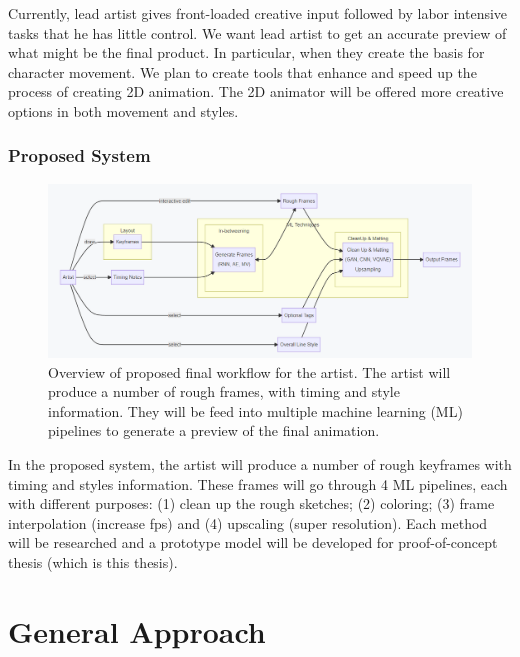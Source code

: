 Currently, lead artist gives front-loaded creative input followed by labor intensive tasks that he has little control. We want lead artist to get an accurate preview of what might be the final product. In particular, when they create the basis for character movement. We plan to create tools that enhance and speed up the process of creating 2D animation. The 2D animator will be offered more creative options in both movement and styles.

\subsubsection{Proposed System}

\begin{figure}
    \centering
    \includegraphics[width=1\textwidth]{images/introduction/proposed_workflow.png}
    \caption{Overview of proposed final workflow for the artist. The artist will produce a number of rough frames, with timing and style information. They will be feed into multiple machine learning (ML) pipelines to generate a preview of the final animation.} 
    \label{fig:proposed_worflow}
\end{figure}

In the proposed system, the artist will produce a number of rough keyframes with timing and styles information. These frames will go through 4 ML pipelines, each with different purposes: (1) clean up the rough sketches; (2) coloring; (3) frame interpolation (increase fps) and (4) upscaling (super resolution). Each method will be researched and a prototype model will be developed for proof-of-concept thesis (which is this thesis).


\section{General Approach}
